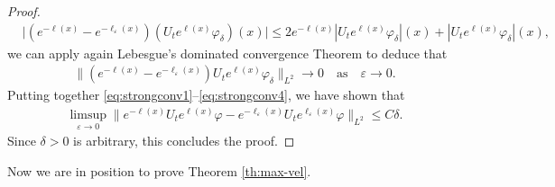 \documentclass[12pt]{article}
\theoremstyle{plain}
\begin{document}
\begin{proof}
\begin{align*}
    &\big|(e^{-\ell(x)}-e^{-\ell_\varepsilon(x)})(U_te^{\ell(x)}\varphi_\delta)(x)\big|\le2e^{-\ell(x)}|U_te^{\ell(x)}\varphi_\delta|(x)+|U_te^{\ell(x)}\varphi_\delta|(x),
\end{align*}
we can apply again Lebesgue's dominated convergence Theorem to deduce that
\begin{align}
    \big\|(e^{-\ell(x)}-e^{-\ell_\varepsilon(x)})U_te^{\ell(x)}\varphi_\delta\big\|_{L^2}\to0 \quad\text{as}\quad \varepsilon\to0.\label{eq:strongconv4}
\end{align}
Putting together \eqref{eq:strongconv1}--\eqref{eq:strongconv4}, we have shown that
\begin{align*}
   \limsup_{\varepsilon\to0} \big\|e^{-\ell(x)}U_te^{\ell(x)}\varphi-e^{-\ell_\varepsilon(x)}U_te^{\ell_\varepsilon(x)}\varphi\big\|_{L^2}\le C\delta.
\end{align*}
Since $\delta>0$ is arbitrary, this concludes the proof.
	\end{proof}
	
	

Now we are in position to prove Theorem \ref{th:max-vel}.
\end{document}
